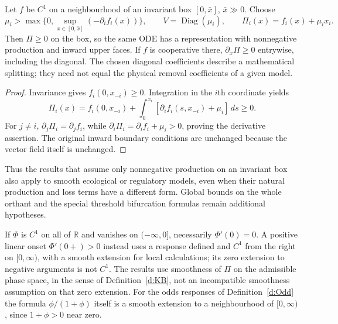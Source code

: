 Let $f$ be $C^1$ on a neighbourhood of an invariant box $[0,\bar x]$,
$\bar x\gg0$. Choose
\[
 \mu_i>\max\{0,\sup_{x\in[0,\bar x]}(-\partial_i f_i(x))\},\qquad
 V=\operatorname{Diag}(\mu_i),\qquad \Pi_i(x)=f_i(x)+\mu_i x_i.
\]
Then $\Pi\ge0$ on the box, so the same ODE has a representation with
nonnegative production and inward upper faces. If $f$ is cooperative there, $\partial_x\Pi\ge0$ entrywise,
including the diagonal.
The chosen diagonal coefficients describe a mathematical splitting;
they need not equal the physical removal coefficients of a given model.
\eeP
\begin{proof}
Invariance gives $f_i(0,x_{-i})\ge0$. Integration in the $i$th
coordinate yields
\[
 \Pi_i(x)=f_i(0,x_{-i})+
 \int_0^{x_i}[\partial_i f_i(s,x_{-i})+\mu_i]\,ds\ge0.
\]
For $j\ne i$, $\partial_j\Pi_i=\partial_j f_i$, while
$\partial_i\Pi_i=\partial_i f_i+\mu_i>0$, proving the derivative assertion. The original inward boundary conditions are
unchanged because the vector field itself is unchanged.
\end{proof}
Thus the results that assume only nonnegative production on an invariant
box also apply to smooth ecological or regulatory models, even when their natural
production and loss terms have a different form. Global bounds on the
whole orthant and the special threshold bifurcation formulas remain
additional hypotheses.
\eeR

If $\Phi$ is $C^1$ on all of $\mathbb R$ and vanishes on
$(-\infty,0]$, necessarily $\Phi'(0)=0$. A positive linear onset
$\Phi'(0+)>0$ instead uses a response defined and $C^1$ from the right
on $[0,\infty)$, with a smooth extension for local calculations;
its zero extension to negative arguments is not $C^1$. The results
use smoothness of $\Pi$ on the admissible phase space, in the sense of
Definition~\ref{d:KB}, not an incompatible smoothness assumption on that
zero extension. For the odds responses of Definition~\ref{d:Odd} the
formula $\phi/(1+\phi)$ itself is a smooth extension to a neighbourhood
of $[0,\infty)$, since $1+\phi>0$ near zero.
\eeR

